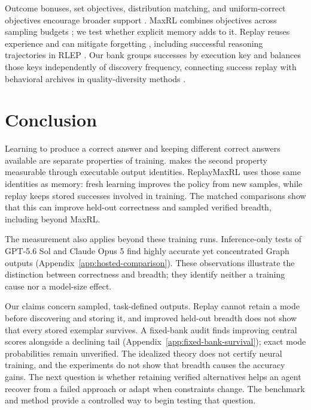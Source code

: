 Outcome bonuses, set objectives, distribution matching, and uniform-correct
objectives encourage broader support
\citep{song2025outcome,chen2025passktraining,li2025divergence,
li2026setpo,li2026distribution,lochab2026ucpo}. MaxRL combines objectives across
sampling budgets \citep{tajwar2026maxrl}; we test whether explicit memory adds
to it. Replay reuses experience and can mitigate forgetting
\citep{lin1992selfimproving,rolnick2019replay}, including successful reasoning
trajectories in RLEP \citep{zhang2025rlep}. Our bank groups successes by
execution key and balances those keys independently of discovery frequency,
connecting success replay with behavioral archives in quality-diversity methods
\citep{mouret2015illuminating,ecoffet2021return}.

\section{Conclusion}
\label{sec:conclusion}
\label{sec:discussion}
\label{sec:limitations}

Learning to produce a correct answer and keeping different correct answers
available are separate properties of training. \mb{} makes the second
property measurable through executable output identities. ReplayMaxRL uses
those same identities as memory: fresh learning improves the policy from new
samples, while replay keeps stored successes involved in training. The matched
comparisons show that this can improve held-out correctness and sampled
verified breadth, including beyond MaxRL.

\label{sec:hosted-concentration}
The measurement also applies beyond these training runs. Inference-only tests
of GPT-5.6 Sol and Claude Opus 5 find highly accurate yet concentrated Graph
outputs (Appendix~\ref{app:hosted-comparison}). These observations illustrate
the distinction between correctness and breadth; they identify neither a
training cause nor a model-size effect.

Our claims concern sampled, task-defined outputs. Replay cannot retain a mode
before discovering and storing it, and improved held-out breadth does not
show that every stored exemplar survives. A fixed-bank audit finds improving
central scores alongside a declining tail
(Appendix~\ref{app:fixed-bank-survival}); exact mode probabilities remain
unverified. The idealized theory does not certify neural training, and the
experiments do not show that breadth causes the accuracy gains. The next
question is whether retaining verified alternatives helps an agent recover
from a failed approach or adapt when constraints change. The benchmark and
method provide a controlled way to begin testing that question.
\label{sec:main-end}

\clearpage
{}\label{sec:references}




